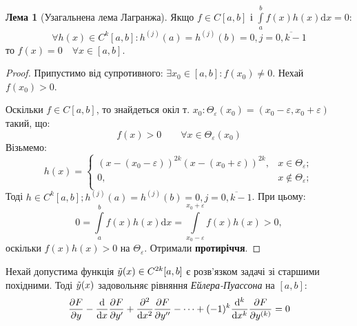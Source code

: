 \documentclass[14pt,a4paper]{scrartcl}
\theoremstyle{definition}
\newtheorem*{lema}{Лема}
\theoremstyle{definition}
\theoremstyle{definition}
\begin{document}
\begin{lema}[Узагальнена лема Лагранжа]
Якщо $f \in C[a,b] $ і $ \int\limits_{a}^{b}{f(x)h(x) \mathrm{d} x}  = 0$:
$$
\forall h(x) \in C^{k}[a,b] : h^{(j)} (a) = h^{(j)} (b) = 0 , j = \overline{0, k-1}
$$
то $f(x) = 0 \quad \forall x\in [a,b]$.
\end{lema}
\begin{proof}
 Припустимо від супротивного: $\exists x_0 \in [a,b] : f(x_0) \neq 0$. Нехай $f(x_0)>0$.\par
 Оскільки $f\in C[a,b]$, то знайдеться окіл т. $x_0 : \Theta_{\varepsilon} (x_0) = (x_0 - \varepsilon, x_0 + \varepsilon )$ такий, що:
 $$
 f(x) >0 \qquad \forall x \in \Theta_{\varepsilon}(x_0)
 $$
 Візьмемо:
 $$
 h(x) = \begin{cases}
  (x - (x_0 - \varepsilon))^{2k} (x - (x_0 + \varepsilon))^{2k}, & x \in \Theta_{\varepsilon};\\
  0 , & x \notin \Theta_{\varepsilon};\\
 \end{cases}
 $$
 Тоді $h \in C^{k}[a,b] ; h^{(j)} (a) = h^{(j)}(b) = 0, j=\overline{0, k-1}$. При цьому:
 $$
 0 =  \int\limits_{a}^{b}{ f(x) h(x) \mathrm{d} x} =  \int\limits_{x_0 - \varepsilon}^{x_0 + \varepsilon}{f(x) h(x)} >0,
 $$
 оскільки $f(x)h(x) >0$ на $\Theta_{\varepsilon}$. Отримали \textbf{протиріччя}.
\end{proof}
\newpage

\begin{boxteo}
 Нехай допустима функція $\tilde{y} (x) \in C^{2k} [a,b]$ є розв'язком задачі зі старшими похідними. Тоді $\tilde{y}(x)$ задовольняє рівняння \textit{Ейлера-Пуассона} на $[a,b]$:
 $$
 \frac{\partial F}{\partial y} - \frac{\mathrm{d}}{\mathrm{d} x} \frac{\partial F}{\partial y'} + \frac{\partial^2}{\mathrm{d} x^2} \frac{\partial F}{\partial y''} - \dots + (-1)^k \frac{\mathrm{d}^k}{\mathrm{d} x^k} \frac{\partial F}{\partial y^{(k)}} = 0
 $$
\end{boxteo}
\end{document}

